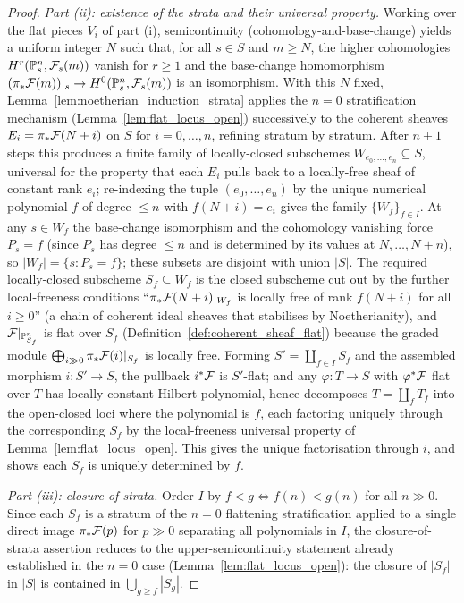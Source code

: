 \begin{proof}
  \emph{Part (ii): existence of the strata and their universal property.}
  Working over the flat pieces \(V_i\) of part (i), semicontinuity
  (cohomology-and-base-change) yields a uniform integer \(N\) such that, for all
  \(s \in S\) and \(m \ge N\), the higher cohomologies \(H^r(\mathbb{P}^n_s, \mathcal{F}_s(m))\)
  vanish for \(r \ge 1\) and the base-change homomorphism
  \((\pi_* \mathcal{F}(m))|_s \to H^0(\mathbb{P}^n_s, \mathcal{F}_s(m))\) is an isomorphism.  With this
  \(N\) fixed, Lemma~\ref{lem:noetherian_induction_strata} applies the \(n = 0\)
  stratification mechanism (Lemma~\ref{lem:flat_locus_open}) successively to the
  coherent sheaves \(E_i = \pi_* \mathcal{F}(N+i)\) on \(S\) for \(i = 0, \dots, n\),
  refining stratum by stratum.  After \(n+1\) steps this produces a finite
  family of locally-closed subschemes \(W_{e_0, \dots, e_n} \subseteq S\),
  universal for the property that each \(E_i\) pulls back to a locally-free sheaf
  of constant rank \(e_i\); re-indexing the tuple \((e_0, \dots, e_n)\) by the
  unique numerical polynomial \(f\) of degree \(\le n\) with \(f(N+i) = e_i\)
  gives the family \(\{W_f\}_{f \in I}\).  At any \(s \in W_f\) the base-change
  isomorphism and the cohomology vanishing force \(P_s = f\) (since \(P_s\) has
  degree \(\le n\) and is determined by its values at \(N, \dots, N+n\)), so
  \(|W_f| = \{s : P_s = f\}\); these subsets are disjoint with union \(|S|\).
  The required locally-closed subscheme \(S_f \subseteq W_f\) is the closed
  subscheme cut out by the further local-freeness conditions
  ``\(\pi_* \mathcal{F}(N+i)|_{W_f}\) is locally free of rank \(f(N+i)\) for all
  \(i \ge 0\)'' (a chain of coherent ideal sheaves that stabilises by
  Noetherianity), and \(\mathcal{F}|_{\mathbb{P}^n_{S_f}}\) is flat over \(S_f\)
  (Definition~\ref{def:coherent_sheaf_flat}) because the graded module
  \(\bigoplus_{i \gg 0} \pi_* \mathcal{F}(i)|_{S_f}\) is locally free.  Forming
  \(S' = \coprod_{f \in I} S_f\) and the assembled morphism \(i : S' \to S\),
  the pullback \(i^* \mathcal{F}\) is \(S'\)-flat; and any \(\varphi : T \to S\) with
  \(\varphi^* \mathcal{F}\) flat over \(T\) has locally constant Hilbert polynomial, hence
  decomposes \(T = \coprod_f T_f\) into the open-closed loci where the polynomial
  is \(f\), each factoring uniquely through the corresponding \(S_f\) by the
  local-freeness universal property of Lemma~\ref{lem:flat_locus_open}.  This
  gives the unique factorisation through \(i\), and shows each \(S_f\) is
  uniquely determined by \(f\).

  \emph{Part (iii): closure of strata.}
  Order \(I\) by \(f < g \iff f(n) < g(n)\) for all \(n \gg 0\).  Since each
  \(S_f\) is a stratum of the \(n = 0\) flattening stratification applied to a
  single direct image \(\pi_* \mathcal{F}(p)\) for \(p \gg 0\) separating all polynomials
  in \(I\), the closure-of-strata assertion reduces to the upper-semicontinuity
  statement already established in the \(n = 0\) case
  (Lemma~\ref{lem:flat_locus_open}): the closure of \(|S_f|\) in \(|S|\) is
  contained in \(\bigcup_{g \ge f} |S_g|\).
\end{proof}

